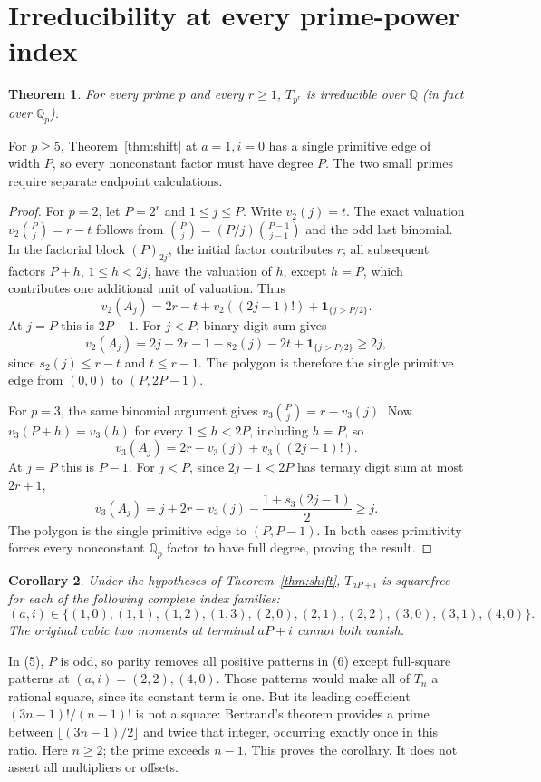 \documentclass[11pt]{article}
\newtheorem{theorem}{Theorem}
\newtheorem{corollary}[theorem]{Corollary}
\begin{document}
\section{Irreducibility at every prime-power index}
\begin{theorem}\label{thm:irred}
For every prime $p$ and every $r\ge1$, $T_{p^r}$ is irreducible over
$\mathbb Q$ (in fact over $\mathbb Q_p$).
\end{theorem}
For $p\ge5$, Theorem~\ref{thm:shift} at $a=1,i=0$ has a single primitive
edge of width $P$, so every nonconstant factor must have degree $P$.
The two small primes require separate endpoint calculations.
\begin{proof}
For $p=2$, let $P=2^r$ and $1\le j\le P$. Write $v_2(j)=t$.
The exact valuation $v_2\binom Pj=r-t$ follows from
$\binom Pj=(P/j)\binom{P-1}{j-1}$ and the odd last binomial.
In the factorial block $(P)_{2j}$, the initial factor contributes $r$;
all subsequent factors $P+h$, $1\le h<2j$, have the valuation of $h$,
except $h=P$, which contributes one additional unit of valuation.
Thus
\[
 v_2(A_j)=2r-t+v_2((2j-1)!)+\mathbf1_{\{j>P/2\}}.
\]
At $j=P$ this is $2P-1$.
For $j<P$, binary digit sum gives
\[
 v_2(A_j)=2j+2r-1-s_2(j)-2t+\mathbf1_{\{j>P/2\}}
                                                    \ge2j,
\]
since $s_2(j)\le r-t$ and $t\le r-1$.
The polygon is therefore the single primitive edge from $(0,0)$ to
$(P,2P-1)$.

For $p=3$, the same binomial argument gives
$v_3\binom Pj=r-v_3(j)$. Now $v_3(P+h)=v_3(h)$ for every
$1\le h<2P$, including $h=P$, so
\[
                 v_3(A_j)=2r-v_3(j)+v_3((2j-1)!).
\]
At $j=P$ this is $P-1$.
For $j<P$, since $2j-1<2P$ has ternary digit sum at most $2r+1$,
\[
 v_3(A_j)=j+2r-v_3(j)-\frac{1+s_3(2j-1)}2\ge j.
\]
The polygon is the single primitive edge to $(P,P-1)$.
In both cases primitivity forces every nonconstant $\mathbb Q_p$ factor
to have full degree, proving the result.
\end{proof}

\begin{corollary}\label{cor:families}
Under the hypotheses of Theorem~\ref{thm:shift}, $T_{aP+i}$ is squarefree
for each of the following complete index families:
\[
 (a,i)\in\{(1,0),(1,1),(1,2),(1,3),
          (2,0),(2,1),(2,2),(3,0),(3,1),(4,0)\}.             \tag{6}
\]
The original cubic two moments at terminal $aP+i$ cannot both vanish.
\end{corollary}
In (5), $P$ is odd, so parity removes all positive patterns in (6)
except full-square patterns at $(a,i)=(2,2),(4,0)$.
Those patterns would make all of $T_n$ a rational square, since its
constant term is one. But its leading coefficient
$(3n-1)!/(n-1)!$ is not a square: Bertrand's theorem provides a prime
between $\lfloor(3n-1)/2\rfloor$ and twice that integer, occurring exactly
once in this ratio. Here $n\ge2$; the prime exceeds $n-1$.
This proves the corollary. It does not assert all multipliers or offsets.
\end{document}
